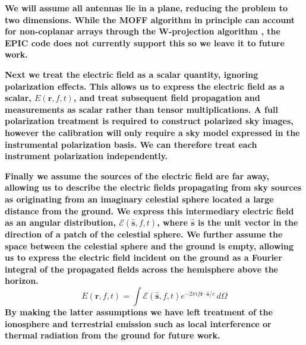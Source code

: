 \documentclass[a4paper,fleqn,usenatbib]{../mnras}
\begin{document}
\textbf{We will assume all antennas lie in a plane, 
reducing the problem to two dimensions. While the MOFF algorithm in principle can account for 
non-coplanar arrays through the W-projection algorithm \citep{cor08}, the EPIC code does not 
currently support this so we leave it to future work.}

\textbf{Next we treat the electric field as a scalar quantity, ignoring polarization effects. This allows us 
to express the electric field as a scalar, $E(\mathbf{r},f,t)$, and treat subsequent field 
propagation and measurements as scalar rather than tensor multiplications. A full polarization 
treatment is required to construct polarized sky images, however the calibration will only 
require a sky model expressed in the instrumental polarization basis. We can therefore treat 
each instrument polarization independently.}

\textbf{Finally we assume the sources of the electric field are far away, allowing us to describe the 
electric fields propagating from sky sources as originating from an imaginary celestial sphere 
located a large distance from the ground. We express this intermediary electric field as an 
angular distribution, $\mathcal{E}(\hat{\mathbf{s}},f,t)$, where $\hat{\mathbf{s}}$ is the unit 
vector in the direction of a patch of the celestial sphere. We further assume the space between 
the celestial sphere and the ground is empty, allowing us to express the electric field incident 
on the ground as a Fourier integral of the propagated fields across the hemisphere above the horizon.
\begin{equation}\label{eq:sky_propagated}
E(\mathbf{r},f,t) = \int \mathcal{E}(\hat{\mathbf{s}},f,t) e^{-2\pi i f\mathbf{r} \cdot \hat{\mathbf{s}}/c}\, d\Omega
\end{equation}  
By making the latter assumptions we have left treatment of the ionosphere and terrestrial 
emission such as local interference or thermal radiation from the ground for future work. }
\end{document}
